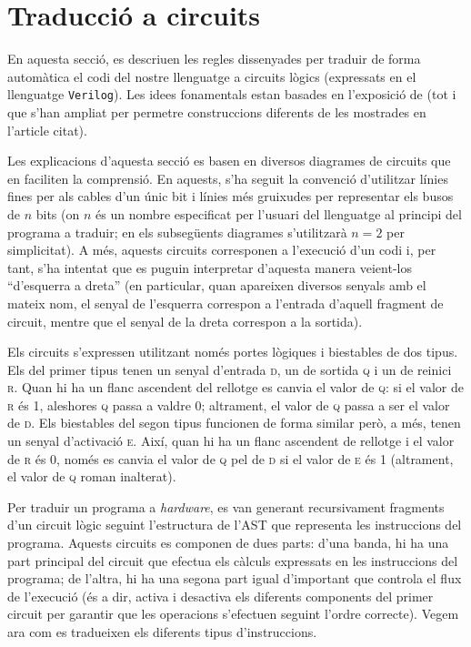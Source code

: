 
\section{Traducció a circuits}

En aquesta secció, es descriuen les regles dissenyades per traduir de forma 
automàtica el codi del nostre llenguatge a circuits lògics (expressats en el 
llenguatge \texttt{Verilog}). Les idees fonamentals estan basades en 
l'exposició de \cite{wirth1998hardware} (tot i que s'han ampliat per permetre 
construccions diferents de les mostrades en l'article citat).

Les explicacions d'aquesta secció es basen en diversos diagrames de circuits 
que en faciliten la comprensió. En aquests, s'ha seguit la convenció 
d'utilitzar línies fines per als cables d'un únic bit i línies més gruixudes 
per representar els busos de \(n\) bits (on \(n\) és un nombre especificat per 
l'usuari del llenguatge al principi del programa a traduir; en els subsegüents
diagrames s'utilitzarà \(n=2\) per simplicitat). A més, aquests circuits 
corresponen a l'execució d'un codi i, per tant, s'ha intentat que es 
puguin interpretar d'aquesta manera veient-los ``d'esquerra a dreta'' (en 
particular, quan apareixen diversos senyals amb el mateix nom, el senyal de 
l'esquerra correspon a l'entrada d'aquell fragment de circuit, mentre que el 
senyal de la dreta correspon a la sortida).

Els circuits s'expressen utilitzant només portes lògiques i biestables de 
dos tipus. Els del primer tipus tenen un senyal d'entrada \textsc{d}, un de 
sortida \textsc{q} i un de reinici \textsc{r}. Quan hi ha un flanc ascendent 
del rellotge es canvia el valor de \textsc{q}: si el valor de \textsc{r} és 1, 
aleshores \textsc{q} passa a valdre 0; altrament, el valor de \textsc{q} 
passa a ser el valor de \textsc{d}. Els biestables del segon tipus 
funcionen de forma similar però, a més, tenen un senyal d'activació 
\textsc{e}. Així, quan hi ha un flanc ascendent de rellotge i el valor de 
\textsc{r} és 0, només es canvia el valor de \textsc{q} pel de \textsc{d} si 
el valor de \textsc{e} és 1 (altrament, el valor de \textsc{q} roman 
inalterat). 

Per traduir un programa a \textit{hardware}, es van generant recursivament 
fragments d'un circuit lògic seguint l'estructura de l'AST que representa les 
instruccions del programa. Aquests circuits es componen de dues parts: d'una 
banda, hi ha una part principal del circuit que efectua els càlculs expressats 
en les instruccions del programa; de l'altra, hi ha una segona part igual 
d'important que controla el flux de l'execució (és a dir, activa i desactiva 
els diferents components del primer circuit per garantir que les operacions 
s'efectuen seguint l'ordre correcte). Vegem ara com es tradueixen els 
diferents tipus d'instruccions.

